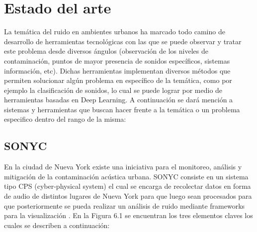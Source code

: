\chapter{Estado del arte}


La temática del ruido en ambientes urbanos ha marcado todo camino de desarrollo de herramientas tecnológicas con las que se puede observar y tratar este problema desde diversos ángulos (observación de los niveles de contaminación, puntos de mayor presencia de sonidos específicos, sistemas  información, etc). Dichas herramientas implementan diversos métodos que permiten solucionar algún problema en específico de la temática, como por ejemplo la clasificación de sonidos, lo cual se puede lograr por medio de herramientas basadas en Deep Learning. A continuación se dará mención a sistemas y herramientas que buscan hacer frente a la temática o un problema especifico dentro del rango de la misma: 


\section{SONYC}En la ciudad de Nueva York existe una iniciativa para el monitoreo, análisis y mitigación de la contaminación acústica urbana. SONYC consiste en un sistema tipo CPS (cyber-physical system)  el cual se encarga de recolectar datos en forma de audio de distintos lugares de Nueva York para que luego sean procesados para que posteriormente se pueda realizar un análisis de ruido mediante frameworks para la visualización \cite{Bello2018}. En la Figura 6.1 se encuentran los tres elementos claves los cuales se describen a continuación:

